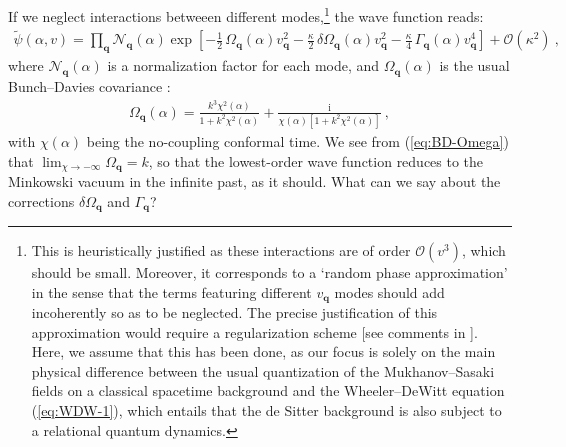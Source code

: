 \documentclass[12pt]{iopart}
\def\eq#1{\begin{equation}\begin{aligned}#1\end{aligned}\end{equation}}
\def\eref#1{(\ref{eq:#1})}
\def\I{\mathrm{i}}
\def\Ob{\mathcal{O}}
\def\q{\mathbf{q}}
\begin{document}
If we neglect interactions betweeen different modes,\footnote{\label{foot:RPA}This is heuristically justified as these interactions are of order $\Ob(v^3)$, which should be small. Moreover, it corresponds to a `random phase approximation' \citep{Chataignier:2020fap} in the sense that the terms featuring different $v_{\q}$ modes should add incoherently so as to be neglected. The precise justification of this approximation would require a regularization scheme [see comments in \citet{Chataignier:2020fap}]. Here, we assume that this has been done, as our focus is solely on the main physical difference between the usual quantization of the Mukhanov--Sasaki fields on a classical spacetime background and the Wheeler--DeWitt equation \eref{WDW-1}, which entails that the de Sitter background is also subject to a relational quantum dynamics.} the wave function reads:
\eq{\label{eq:BD-generalized}
\tilde{\psi}(\alpha,v) = \prod_{\q}\mathcal{N}_{\q}(\alpha)\exp\left[-\frac12\,\Omega_{\q}(\alpha)v_{\q}^2-\frac{\kappa}{2}\,\delta\Omega_{\q}(\alpha)v_{\q}^2-\frac{\kappa}{4}\,\Gamma_{\q}(\alpha)v_{\q}^4\right] + \Ob(\kappa^2) \ ,
}
where $\mathcal{N}_{\q}(\alpha)$ is a normalization factor for each mode, and $\Omega_{\q}(\alpha)$ is the usual Bunch--Davies covariance \citep{Brizuela:2015tzl}:
\eq{\label{eq:BD-Omega}
\Omega_{\q}(\alpha) = \frac{k^3\chi^2(\alpha)}{1+k^2\chi^2(\alpha)}+\frac{\I}{\chi(\alpha)[1+k^2\chi^2(\alpha)]} \ ,
}
with $\chi(\alpha)$ being the no-coupling conformal time. We see from \eref{BD-Omega} that $\lim_{\chi\to-\infty}\Omega_{\q} = k$, so that the lowest-order wave function reduces to the Minkowski vacuum in the infinite past, as it should. What can we say about the corrections $\delta\Omega_{\q}$ and $\Gamma_{\q}$?
\end{document}
